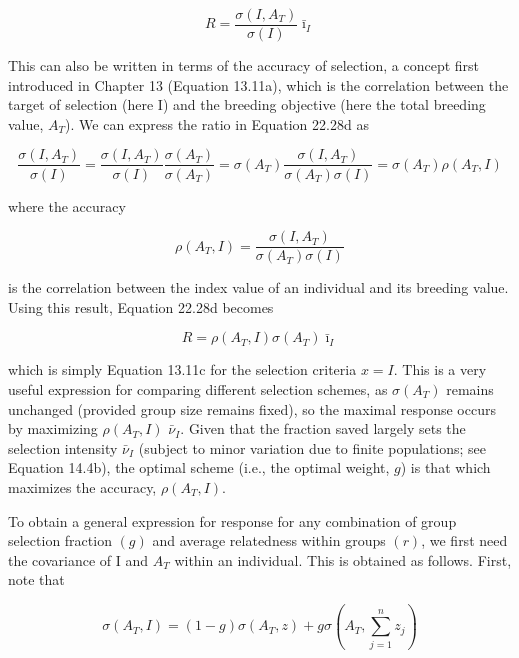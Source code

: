 \documentclass{article}
\begin{document}
\begin{equation}
R=\frac{\sigma(I,A_{T})}{\sigma(I)}\bar{\imath}_{I}
\tag{22.28d}
\label{eq:22_28d}
\end{equation}

This can also be written in terms of the accuracy of selection, a concept first introduced in Chapter 13 (Equation 13.11a), which is the correlation between the target of selection (here I) and the breeding objective (here the total breeding value,  $ A_{T} $). We can express the ratio in Equation 22.28d as

\begin{equation}
\frac{\sigma(I,A_{T})}{\sigma(I)}=\frac{\sigma(I,A_{T})}{\sigma(I)}\frac{\sigma(A_{T})}{\sigma(A_{T})}=\sigma(A_{T})\frac{\sigma(I,A_{T})}{\sigma(A_{T})\sigma(I)}=\sigma(A_{T})\rho(A_{T},I)
\tag{22.28e}
\label{eq:22_28e}
\end{equation}

where the accuracy

\begin{equation}
\rho(A_{T},I)=\frac{\sigma(I,A_{T})}{\sigma(A_{T})\sigma(I)}
\tag{22.28f}
\label{eq:22_28f}
\end{equation}

is the correlation between the index value of an individual and its breeding value. Using this result, Equation 22.28d becomes

\begin{equation}
R=\rho(A_{T},I)\sigma(A_{T})\bar{\imath}_{I}
\tag{22.28g}
\label{eq:22_28g}
\end{equation}

which is simply Equation 13.11c for the selection criteria  $ x = I $. This is a very useful expression for comparing different selection schemes, as  $ \sigma(A_T) $ remains unchanged (provided group size remains fixed), so the maximal response occurs by maximizing  $ \rho(A_T, I) $  $ \bar{\nu}_I $. Given that the fraction saved largely sets the selection intensity  $ \bar{\nu}_I $ (subject to minor variation due to finite populations; see Equation 14.4b), the optimal scheme (i.e., the optimal weight,  $ g $) is that which maximizes the accuracy,  $ \rho(A_T, I) $.

To obtain a general expression for response for any combination of group selection fraction  $ (g) $ and average relatedness within groups  $ (r) $, we first need the covariance of I and  $ A_{T} $ within an individual. This is obtained as follows. First, note that

\begin{equation}
\sigma\left(A_{T},I\right)=\left(1-g\right)\sigma\left(A_{T},z\right)+g\sigma\left(A_{T},\sum_{j=1}^{n}z_{j}\right)
\tag{22.29a}
\label{eq:22_29a}
\end{equation}
\end{document}
